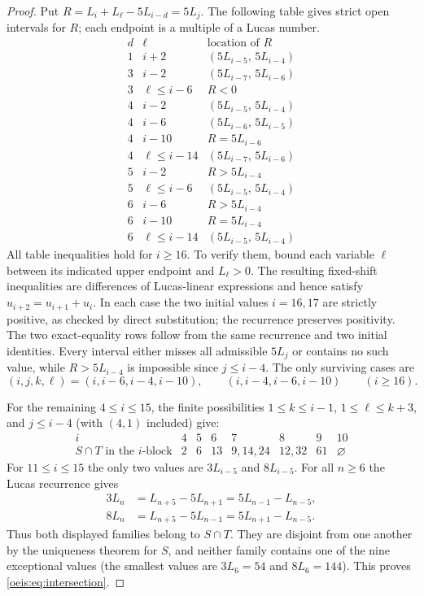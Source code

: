 \documentclass[11pt]{article}
\begin{document}
\begin{proof}
Put $R=L_i+L_\ell-5L_{i-d}=5L_j$.
The following table gives strict open intervals for $R$;
each endpoint is a multiple of a Lucas number.
\[
\begin{array}{c|c|l}
d&\ell&\text{location of }R\\ \hline
1&i+2&(5L_{i-5},\,5L_{i-4})\\
3&i-2&(5L_{i-7},\,5L_{i-6})\\
3&\ell\le i-6&R<0\\
4&i-2&(5L_{i-5},\,5L_{i-4})\\
4&i-6&(5L_{i-6},\,5L_{i-5})\\
4&i-10&R=5L_{i-6}\\
4&\ell\le i-14&(5L_{i-7},\,5L_{i-6})\\
5&i-2&R>5L_{i-4}\\
5&\ell\le i-6&(5L_{i-5},\,5L_{i-4})\\
6&i-6&R>5L_{i-4}\\
6&i-10&R=5L_{i-4}\\
6&\ell\le i-14&(5L_{i-5},\,5L_{i-4})
\end{array}
\]
All table inequalities hold for $i\ge16$.
To verify them, bound each variable $\ell$ between its
indicated upper endpoint and $L_\ell>0$.
The resulting fixed-shift inequalities are differences of
Lucas-linear expressions and hence satisfy
$u_{i+2}=u_{i+1}+u_i$. In each case the two initial values
$i=16,17$ are strictly positive, as checked by direct substitution;
the recurrence preserves positivity. The two exact-equality
rows follow from the same recurrence and two initial identities.
Every interval either misses all admissible $5L_j$ or contains
no such value, while $R>5L_{i-4}$ is impossible since $j\le i-4$.
The only surviving cases are
\[
(i,j,k,\ell)=(i,i-6,i-4,i-10),\qquad
(i,i-4,i-6,i-10)\qquad(i\ge16).
\]

For the remaining $4\le i\le15$, the finite possibilities
$1\le k\le i-1$, $1\le\ell\le k+3$, and
$j\le i-4$ (with $(4,1)$ included) give:
\[
\begin{array}{c|ccccccc}
i&4&5&6&7&8&9&10\\ \hline
S\cap T\text{ in the }i\text{-block}
&2&6&13&9,14,24&12,32&61&\varnothing
\end{array}
\]
For $11\le i\le15$ the only two values are
$3L_{i-5}$ and $8L_{i-5}$.
For all $n\ge6$ the Lucas recurrence gives
\begin{align*}
3L_n&=L_{n+5}-5L_{n+1}=5L_{n-1}-L_{n-5},\\
8L_n&=L_{n+5}-5L_{n-1}=5L_{n+1}-L_{n-5}.
\end{align*}
Thus both displayed families belong to $S\cap T$.
They are disjoint from one another by the uniqueness theorem
for $S$, and neither family contains one of the nine exceptional
values (the smallest values are $3L_6=54$ and $8L_6=144$). This proves \eqref{oeis:eq:intersection}.
\end{proof}
\end{document}
